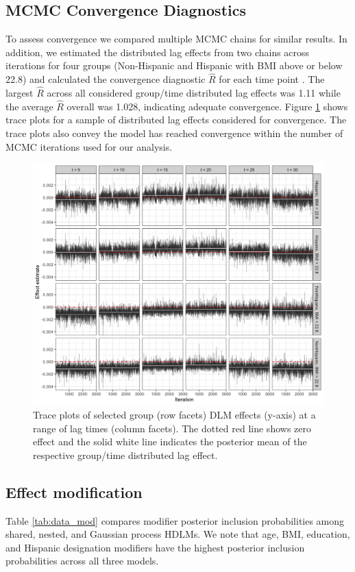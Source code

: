 \documentclass[12pt]{article}
\begin{document}
\subsection{MCMC Convergence Diagnostics}
To assess convergence we compared multiple MCMC chains for similar results. In addition, we estimated the distributed lag effects from two chains across iterations for four groups (Non-Hispanic and Hispanic with BMI above or below 22.8) and calculated the convergence diagnostic $\hat{R}$ for each time point \citep{Gelman1992InferenceSequences}. The largest $\hat{R}$ across all considered group/time distributed lag effects was 1.11 while the average $\hat{R}$ overall was 1.028, indicating adequate convergence. Figure \ref{fig:trace} shows trace plots for a sample of distributed lag effects considered for convergence. The trace plots also convey the model has reached convergence within the number of MCMC iterations used for our analysis.

\begin{figure}[!ht]
    \centering
    \includegraphics[width=\textwidth]{img/dlm_traceplots.png}
    \caption{Trace plots of selected group (row facets) DLM effects (y-axis) at a range of lag times (column facets). The dotted red line shows zero effect and the solid white line indicates the posterior mean of the respective group/time distributed lag effect.}
    \label{fig:trace}
\end{figure}




\subsection{Effect modification}
Table \ref{tab:data_mod} compares modifier posterior inclusion probabilities among shared, nested, and Gaussian process HDLMs. We note that age, BMI, education, and Hispanic designation modifiers have the highest posterior inclusion probabilities across all three models.
\end{document}
